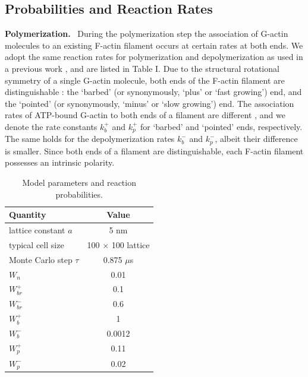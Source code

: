 \documentclass[aps,preprint,pre,array,epsfig,eqsecnum]{revtex4}
\begin{document}
\noindent
\subsection{Probabilities and Reaction Rates}

\vskip0.2cm\noindent
{\bf Polymerization.}~
During the polymerization step the association of G-actin molecules 
to an existing F-actin filament occurs at certain rates at both ends.
We adopt the same reaction rates for polymerization and depolymerization
as used in a previous work \cite{Satya04}, and are listed in Table I.
%
Due to the structural rotational symmetry of a single G-actin molecule,
both ends of the F-actin filament are distinguishable : the `barbed'
(or synonymously, `plus' or `fast growing') end, and the `pointed'
(or synonymously, `minus' or `slow growing') end.
%
The association rates of ATP-bound G-actin to both ends of a filament
are different \cite{Bray92,Alberts98,Wegner76,Wang85}, and we denote
the rate constants $k^+_b$ and
$k^+_p$ for `barbed' and `pointed' ends, respectively. 
The same holds for the
depolymerization rates $k^-_b$ and $k^-_p$, albeit their difference
is smaller.
Since both ends of a filament are distinguishable, 
each F-actin filament possesses an intrinsic polarity.


\begin{table}\label{tab:model}
{\footnotesize
\begin{tabular}{|l|c|}
\hline
    Quantity                &  Value         \\ \hline
  lattice constant $a$ &  5 nm                         \\
  typical cell size & 100 $\times$ 100 lattice \\
  Monte Carlo step $\tau$  &  0.875 $\mu$s  \\
  $W_n$                  & 0.01   \\
  $W_{br}^+$               & 0.1   \\
  $W_{br}^-$               & 0.6  \\
  $W_b^+$                & 1    \\
  $W_b^-$                & 0.0012     \\ 
  $W_p^+$                & 0.11   \\
  $W_p^-$                & 0.02    \\ \hline   
\end{tabular}
\caption{Model parameters and reaction probabilities.}  
}
\end{table}
\end{document}
